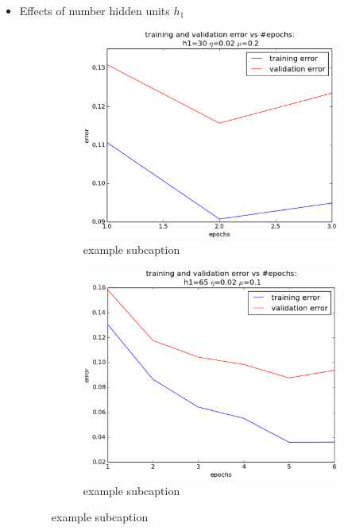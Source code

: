 \begin{itemize}
	\item Effects of number hidden units $h_1$
		\begin{figure}[!ht]
		\centering
		\begin{subfigure}[b]{.45\textwidth}
		\centering
		\includegraphics[width=\textwidth]{mlp/plots/30h1.eps}
		\caption{example subcaption}
		\end{subfigure}
		\quad
		\begin{subfigure}[b]{.45\textwidth}
		\centering
		\includegraphics[width=\textwidth]{mlp/plots/65h1.eps}
		\caption{example subcaption}

\end{subfigure}
\end{figure}
\end{itemize}
